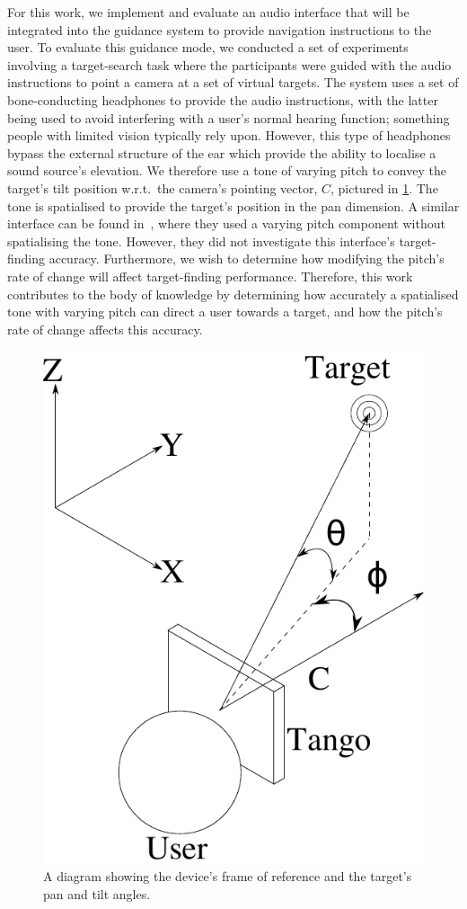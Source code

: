 \documentclass{llncs}
\begin{document}
For this work, we implement and evaluate an audio interface that will be integrated into the guidance system to provide navigation instructions to the user. 
To evaluate this guidance mode, we conducted a set of experiments involving a target-search task where the participants were guided with the audio instructions to point a camera at a set of virtual targets.
The system uses a set of bone-conducting headphones to provide the audio instructions, with the latter being used to avoid interfering with a user's normal hearing function; something people with limited vision typically rely upon. 
However, this type of headphones bypass the external structure of the ear which provide the ability to localise a sound source's elevation.
We therefore use a tone of varying pitch to convey the target's tilt position w.r.t.\ the camera's pointing vector, $C$, pictured in \cref{fig:cam-coords}.
The tone is spatialised to provide the target's position in the pan dimension.
A similar interface can be found in~\cite{durette2008visuo}, where they used a varying pitch component without spatialising the tone. 
However, they did not investigate this interface's target-finding accuracy.
Furthermore, we wish to determine how modifying the pitch's rate of change will affect target-finding performance. 
Therefore, this work contributes to the body of knowledge by determining how accurately a spatialised tone with varying pitch can direct a user towards a target, and how the pitch's rate of change affects this accuracy.

\begin{figure}
  \centering
  \includegraphics[width=0.4\columnwidth]{figures/camera_coordinate.pdf}
  \caption{A diagram showing the device's frame of reference and the target's pan and tilt angles.}\label{fig:cam-coords}
\end{figure}
\end{document}
